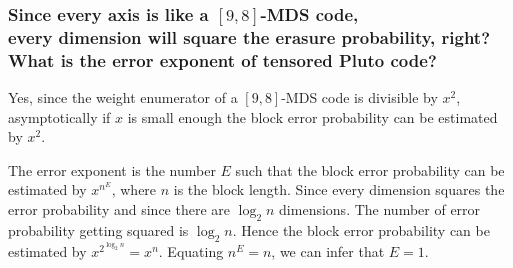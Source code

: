 \documentclass[aspectratio=169, t]{beamer}
\begin{document}

\begin{frame}
	\frametitle{Since every axis is like a $[9, 8]$-MDS code, \\
				every dimension will square the erasure probability, right? \\
				What is the error exponent of tensored Pluto code?}

	Yes, since the weight enumerator of a $[9, 8]$-MDS code
	is divisible by $x^2$, asymptotically if $x$ is small enough
	the block error probability can be estimated by $x^2$.

	\pause

	The error exponent is the number $E$ such that
	the block error probability can be estimated by $x^{n^E}$,
	where $n$ is the block length.
	Since every dimension squares the error probability
	and since there are $\log_2 n$ dimensions.
	The number of error probability getting squared is $\log_2 n$.
	Hence the block error probability can be estimated by
	$x^{2^{\log_2 n}} = x^n$.
	Equating $n^E = n$, we can infer that $E = 1$.
\end{frame}
\end{document}
